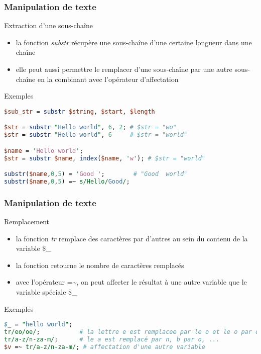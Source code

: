 \begin{frame}[fragile]
  \frametitle{Manipulation de texte}

  \begin{block}{Extraction d'une sous-chaîne}
    \begin{itemize}
    \item la fonction \textit{substr} récupère une sous-chaîne d'une certaine
      longueur dans une chaîne
    \item elle peut aussi permettre le remplacer d'une sous-chaîne par une
      autre sous-chaîne en la combinant avec l'opérateur d'affectation
    \end{itemize}
  \end{block}

  \begin{exampleblock}{Exemples}
    \begin{lstlisting}[language=perl]
$sub_str = substr $string, $start, $length

$str = substr "Hello world", 6, 2; # $str = "wo"
$str = substr "Hello world", 6     # $str = "world"

$name = 'Hello world';
$str = substr $name, index($name, 'w'); # $str = "world"

substr($name,0,5) = 'Good ';        # "Good  world"
substr($name,0,5) =~ s/Hello/Good/;
    \end{lstlisting}
  \end{exampleblock}
\end{frame}

\begin{frame}[fragile]
  \frametitle{Manipulation de texte}

  \begin{block}{Remplacement}
    \begin{itemize}
    \item la fonction \textit{tr} remplace des caractères par d'autres
      au sein du contenu de la variable \$\_
    \item la fonction retourne le nombre de caractères remplacés
    \item avec l'opérateur =\textasciitilde, on peut affecter le résultat à une
      autre variable que le variable spéciale \$\_
    \end{itemize}
  \end{block}

  \begin{exampleblock}{Exemples}
    \begin{lstlisting}[language=perl]
$_ = "hello world";
tr/eo/oe/;           # la lettre e est remplacee par le o et le o par e
tr/a-z/n-za-m/;      # le a est remplacé par n, b par o, ...
$v =~ tr/a-z/n-za-m/; # affectation d'une autre variable
    \end{lstlisting}
  \end{exampleblock}
\end{frame}

